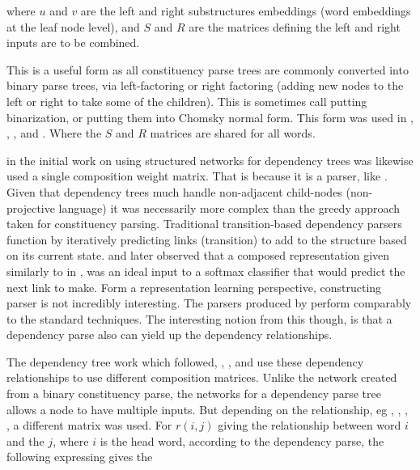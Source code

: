 \documentclass[12pt,parskip]{komatufte}
\begin{document}
where $u$ and $v$ are the left and right substructures embeddings (word embeddings at the leaf node level), and $S$ and $R$ are the matrices defining the left and right inputs are to be combined.

This is a useful form as all constituency parse trees are commonly converted into binary parse trees, via left-factoring or right factoring (adding new nodes to the left or right to take some of the children).
This is sometimes call putting binarization, or putting them into  Chomsky normal form.
This form was used in , \textcite{SocherEtAl2011:RAE},  \textcite{SocherEtAl2011:PoolRAE},
 \textcite{Socher2011ParsingPhrases} and \textcite{zhang2014BRAE}.
Where the $S$ and $R$ matrices are shared for all words.


 in the initial work on using structured networks for dependency trees was likewise used a single composition weight matrix.
That is because it is a parser, like \textcite{socher2010PhraseEmbedding}.
Given that dependency trees much handle non-adjacent child-nodes (non-projective language) it was necessarily more complex than the greedy approach taken for constituency parsing.
Traditional transition-based dependency parsers function by iteratively predicting links (transition) to add to the structure based on its current state.
\textcite{stenetorp2013transition} and later  observed that a composed representation given similarly to in , was an ideal input to a softmax classifier that would predict the next link to make.
Form a representation learning perspective, constructing parser is not incredibly interesting.
The parsers produced by \textcite{socher2010PhraseEmbedding, stenetorp2013transition, bowman2016fast} perform comparably to the standard techniques.
The interesting notion from this though, is that a dependency parse also can yield up the dependency relationships.


The dependency tree work which followed, , , and  use these dependency relationships to use different composition matrices.
Unlike the network created from a binary constituency parse, the networks for a dependency parse tree allows a node to have multiple inputs.
But depending on the relationship, eg , , , , a different matrix was used.
For $r(i,j)$ giving the relationship between word $i$ and the $j$, where $i$ is the head word, according to the dependency parse,
the following expressing gives the 
\end{document}
